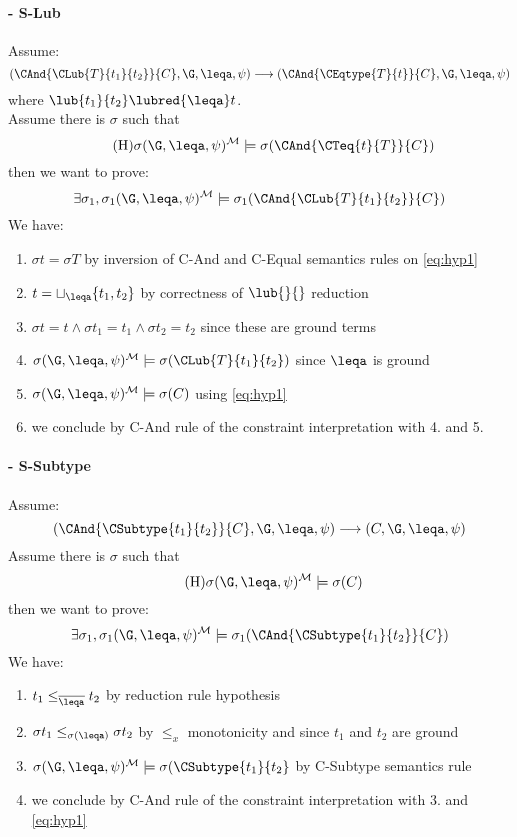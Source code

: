 \paragraph{- \sc S-Lub}
Assume:
$$(\CAnd{\CLub{T}{t_1}{t_2}}{C},\G,\leqa,\psi) \longrightarrow (\CAnd{\CEqtype{T}{t}}{C}, \G, \leqa, \psi) $$
where $\lub{t_1}{t_2} \lubred{\leqa} t$.\\
Assume there is $\sigma$ such that 
\begin{equation}\tag{H}
  \label{eq:hyp1}
\sigma(\G,\leqa,\psi)\tomod\models \sigma(\CAnd{\CTeq{t}{T}}{C})
\end{equation}
then we want to prove:
\begin{equation*}
\exists \sigma_1, \sigma_1(\G,\leqa,\psi)\tomod\models \sigma_1(\CAnd{\CLub{T}{t_1}{t_2}}{C})
\end{equation*}
We have:    
\begin{enumerate}
 \item $\sigma t = \sigma T$ by inversion of {\sc C-And} and {\sc C-Equal} semantics rules on \ref{eq:hyp1}
 \item $ t = \sqcup_{\leqa}\{t_1,t_2\}$ by correctness of $\lub{}{}$ reduction
 \item $\sigma t = t \wedge \sigma t_1 = t_1 \wedge \sigma t_2 = t_2$  since these are ground terms
 \item $\sigma(\G,\leqa,\psi)\tomod\models \sigma(\CLub{T}{t_1}{t_2})$
  since $\leqa$ is ground
 \item $\sigma(\G,\leqa,\psi)\tomod\models \sigma(C)$ using \ref{eq:hyp1}   
 \item we conclude by {\sc C-And} rule of the constraint interpretation with 4. and 5.
\end{enumerate}
\sepa
\paragraph{- \sc S-Subtype}
Assume:
$$(\CAnd{\CSubtype{t_1}{t_2}}{C},\G,\leqa,\psi) \longrightarrow ({C}, \G, \leqa, \psi) $$
Assume there is $\sigma$ such that 
\begin{equation}\tag{H}
  \label{eq:hyp1}
\sigma(\G,\leqa,\psi)\tomod\models \sigma({C})
\end{equation}
then we want to prove:
\begin{equation*}
\exists \sigma_1, \sigma_1(\G,\leqa,\psi)\tomod\models \sigma_1(\CAnd{\CSubtype{t_1}{t_2}}{C})
\end{equation*}
We have:    
\begin{enumerate}
 \item $ t_1 \leq_{\overline{\leqa}} t_2$ by reduction rule hypothesis
 \item $ \sigma t_1 \leq_{\sigma(\leqa)} \sigma t_2 $ by $\leq_x$ monotonicity and since $t_1$ and $t_2$ are ground 
 \item $\sigma(\G,\leqa,\psi)\tomod\models \sigma(\CSubtype{t_1}{t_2}$ by {\sf C-Subtype} semantics rule
 \item we conclude by {\sc C-And} rule of the constraint interpretation with 3. and \ref{eq:hyp1}
\end{enumerate}
\sepa
